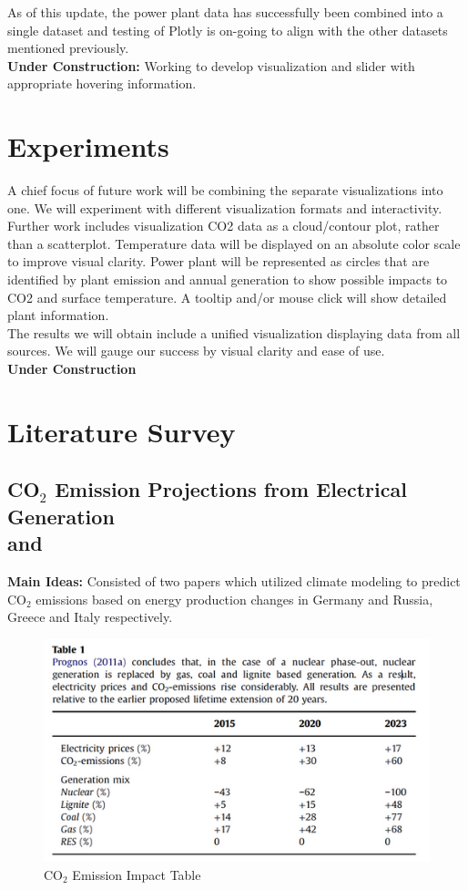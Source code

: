 \documentclass[sigconf,nonacm=true]{acmart}
\begin{document}
As of this update, the power plant data has successfully been combined into a single dataset and testing of Plotly is on-going to align with the other datasets mentioned previously.\\

\textbf{Under Construction: } Working to develop visualization and slider with appropriate hovering information.

\section{Experiments}
A chief focus of future work will be combining the separate visualizations into one. We will experiment with different visualization formats and interactivity. \\

Further work includes visualization CO2 data as a cloud/contour plot, rather than a scatterplot. Temperature data will be displayed on an absolute color scale to improve visual clarity. Power plant will be represented as circles that are identified by plant emission and annual generation to show possible impacts to CO2 and surface temperature.  A tooltip and/or mouse click will show detailed plant information. \\

The results we will obtain include a unified visualization displaying data from all sources. We will gauge our success by visual clarity and ease of use. \\

\textbf{Under Construction}
\section{Literature Survey}
\subsection{CO$_2$ Emission Projections from Electrical Generation\\ \cite[Page Count:~11]{Comfort_1_Bruninx} and \cite[Page Count:~17]{Comfort_2_HammonsT2006IoEP}}
\textbf{Main Ideas:} Consisted of two papers which utilized climate modeling to predict CO$_2$ emissions based on energy production changes in Germany and Russia, Greece and Italy respectively.
\begin{figure}[H]
	\centering
	\includegraphics[width=0.9\linewidth]{images/co2ProjectTable}
	\caption{CO$_2$ Emission Impact Table \protect\cite{Comfort_1_Bruninx}}
	\label{fig:co2german}
\end{figure}
\end{document}
